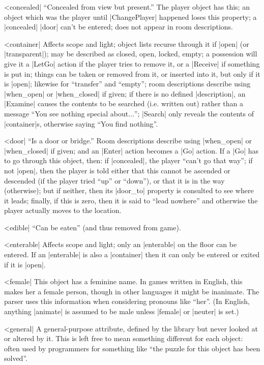 ^^|concealed|%
``Concealed from view but present.''
The player object has this; an object which was the player until
|ChangePlayer| happened loses this property; a |concealed| |door| can't be
entered; does not appear in room descriptions.

^^|container|%
Affects scope and light; object lists
recurse through it if |open| (or |transparent|); may be described as closed,
open, locked, empty; a possession will give it a |LetGo| action if the
player tries to remove it, or a |Receive| if something is put in; things can
be taken or removed from it, or inserted into it, but only if it is |open|;
likewise for ``transfer'' and ``empty''; room descriptions describe using
|when_open| or |when_closed| if given; if there is no defined |description|,
an |Examine| causes the contents to be searched (i.e. written out) rather
than a message ``You see nothing special about$\ldots$''; |Search| only reveals
the contents of |container|s, otherwise saying ``You find nothing''.

^^|door|
``Is a door or bridge.''  Room descriptions
describe using |when_open| or |when_closed| if given; and an |Enter|
action becomes a |Go| action.  If a |Go| has to go through this
object, then: if |concealed|, the player ``can't go that way'';
if not |open|, then the player is told either that this cannot
be ascended or descended (if the player tried ``up'' or
``down''), or that it is in the way (otherwise);
but if neither, then its |door_to| property is consulted to
see where it leads; finally, if this is zero, then it is said
to ``lead nowhere'' and otherwise the player actually moves to
the location.

^^|edible|
``Can be eaten'' (and thus removed from game).

^^|enterable|
Affects scope and light; only an |enterable| on the floor can be
entered.  If an |enterable| is also a |container| then it can
only be entered or exited if it is |open|.

^^|female|
This object has a feminine name.  In games written in English,
this makes her a female person, though in other languages it might
be inanimate.  The parser uses this information when considering
pronouns like ``her''.  (In English, anything |animate| is assumed
to be male unless |female| or |neuter| is set.)

^^|general|
A general-purpose attribute, defined by
the library but never looked at or altered by it.  This is left
free to mean something different for each object: often used by
programmers for something like ``the puzzle for this object has been
solved''.

